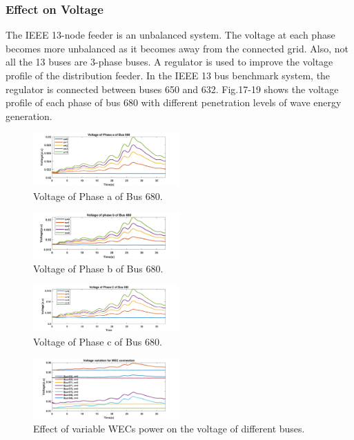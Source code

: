 \documentclass[conference]{IEEEtran}
\begin{document}
\subsubsection{Effect on Voltage}
The IEEE 13-node feeder is an unbalanced system. The voltage at each phase becomes more unbalanced as it becomes away from the connected grid. Also, not all the 13 buses are 3-phase buses. A regulator is used to improve the voltage profile of the distribution feeder. In the IEEE 13 bus benchmark system, the regulator is connected between buses 650 and 632. Fig.17-19 shows the voltage profile of each phase of bus 680 with different penetration levels of wave energy generation. \\

\begin{figure}[htbp]
    \centering
    \includegraphics[width=0.5\textwidth]{Figs/5_3_1/vol_normal680a.png}
    \caption{Voltage of Phase a of Bus 680.}
    \label{fig:W2G_normal_grid}
\end{figure}
\begin{figure}[h!]
    \centering
    \includegraphics[width=0.5\textwidth]{Figs/5_3_1/vol_normal680b.png}
    \caption{Voltage of Phase b of Bus 680.}
    \label{fig:LPMG_position_velocity}
\end{figure}
\begin{figure}[h!]
    \centering
    \includegraphics[width=0.5\textwidth]{Figs/5_3_1/vol_normal680c.png}
    \caption{Voltage of Phase c of Bus 680.}
    \label{fig:W2G_normal_grid}
\end{figure}

\begin{figure}[h!]
    \centering
    \includegraphics[width=0.5\textwidth]{Figs/5_3_1/various bus.png}
    \caption{Effect of variable WECs power on  the voltage of different buses.}
    \label{fig:LPMG_position_velocity}
\end{figure}
\end{document}
